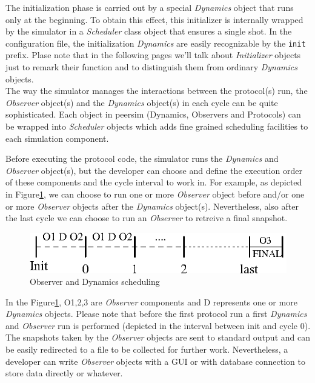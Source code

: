 \documentclass[a4paper,12pt]{article}
\begin{document}
The initialization phase is carried out by a special \emph{Dynamics}
object that runs only at the beginning. To obtain this effect, this
initializer is internally wrapped by the simulator in a \emph{Scheduler} 
class object that ensures a single shot. In the configuration file,
the initialization \emph{Dynamics} are easily recognizable by the
\texttt{init} prefix. Plase note that in the following pages we'll
talk about \emph{Initializer} objects just to remark their function and
to distinguish them from ordinary \emph{Dynamics} objects.\\
The way the simulator manages the interactions between the protocol(s)
run, the \emph{Observer} object(s) and the \emph{Dynamics} object(s)
in each cycle can be quite sophisticated. Each object in peersim 
(Dynamics, Observers and Protocols) can be wrapped into \emph{Scheduler} 
objects which adds fine grained scheduling facilities to each
simulation component.

Before executing the protocol code, the simulator runs the \emph{Dynamics}
and \emph{Observer} object(s), but the developer can choose and define
the execution order of these components and the cycle interval to
work in. For example, as depicted in Figure\ref{obsfigure}, we can
choose to run one or more \emph{Observer} object before and/or one
or more \emph{Observer} objects after the \emph{Dynamics} object(s).
Nevertheless, also after the last cycle we can choose to run an \emph{Observer}
to retreive a final snapshot.


\begin{figure}
\begin{center}
\includegraphics[scale=1.1]{scheduling.eps}
\end{center}
\caption{Observer and Dynamics scheduling\label{obsfigure}}
\end{figure}


In the Figure\ref{obsfigure}, O1,2,3 are \emph{Observer} components
and D represents one or more \emph{Dynamics} objects. Please note
that before the first protocol run a first \emph{Dynamics} and \emph{Observer}
run is performed (depicted in the interval between init and cycle
0). The snapshots taken by the \emph{Observer} objects are sent to
standard output and can be easily redirected to a file to be collected
for further work. Nevertheless, a developer can write \emph{Observer}
objects with a GUI or with database connection to store data directly
or whatever.
\end{document}
